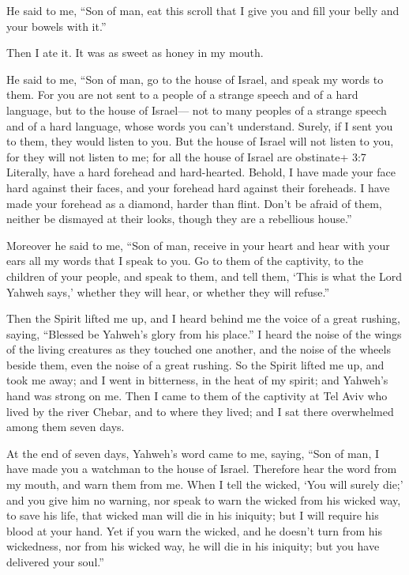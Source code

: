  He said to me, ``Son of man, eat this scroll that I give
you and fill your belly and your bowels with it.''

Then I ate it. It was as sweet as honey in my mouth.

 He said to me, ``Son of man, go to the house of Israel, and
speak my words to them.  For you are not sent to a people of
a strange speech and of a hard language, but to the house of Israel---
 not to many peoples of a strange speech and of a hard
language, whose words you can't understand. Surely, if I sent you to
them, they would listen to you.  But the house of Israel
will not listen to you, for they will not listen to me; for all the
house of Israel are obstinate+ 3:7 Literally, have a hard forehead and
hard-hearted.  Behold, I have made your face hard against
their faces, and your forehead hard against their foreheads.
 I have made your forehead as a diamond, harder than flint.
Don't be afraid of them, neither be dismayed at their looks, though they
are a rebellious house.''

 Moreover he said to me, ``Son of man, receive in your
heart and hear with your ears all my words that I speak to you.
 Go to them of the captivity, to the children of your
people, and speak to them, and tell them, `This is what the Lord Yahweh
says,' whether they will hear, or whether they will refuse.''

 Then the Spirit lifted me up, and I heard behind me the
voice of a great rushing, saying, ``Blessed be Yahweh's glory from his
place.''  I heard the noise of the wings of the living
creatures as they touched one another, and the noise of the wheels
beside them, even the noise of a great rushing.  So the
Spirit lifted me up, and took me away; and I went in bitterness, in the
heat of my spirit; and Yahweh's hand was strong on me. 
Then I came to them of the captivity at Tel Aviv who lived by the river
Chebar, and to where they lived; and I sat there overwhelmed among them
seven days.

 At the end of seven days, Yahweh's word came to me,
saying,  ``Son of man, I have made you a watchman to the
house of Israel. Therefore hear the word from my mouth, and warn them
from me.  When I tell the wicked, `You will surely die;'
and you give him no warning, nor speak to warn the wicked from his
wicked way, to save his life, that wicked man will die in his iniquity;
but I will require his blood at your hand.  Yet if you warn
the wicked, and he doesn't turn from his wickedness, nor from his wicked
way, he will die in his iniquity; but you have delivered your soul.''

